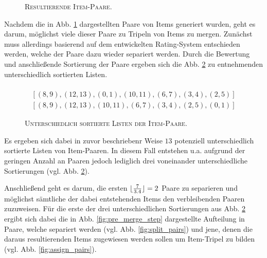 \begin{figure}[H]
\centering
{}
\caption{\textsc{Resultierende Item-Paare}.}
\label{fig:item_pairs_example_b=3}
\end{figure}

Nachdem die in Abb. \ref{fig:item_pairs_example_b=3} dargestellten Paare von Items generiert wurden, geht es darum,
möglichst viele dieser Paare zu Tripeln von Items zu mergen. Zunächst muss allerdings basierend auf dem entwickelten Rating-System
entschieden werden, welche der Paare dazu wieder separiert werden. Durch die Bewertung und anschließende Sortierung der Paare
ergeben sich die Abb. \ref{fig:lists_of_pairs} zu entnehmenden unterschiedlich sortierten Listen.
\begin{figure}[H]
\begin{gather*}
  [(12, 13), (10, 11), (8, 9), (6, 7), (3, 4), (2, 5), (0, 1)] \\
  [(8, 9), (12, 13), (0, 1), (10, 11), (6, 7), (3, 4), (2, 5)] \\
  [(8, 9), (12, 13), (10, 11), (6, 7), (3, 4), (2, 5), (0, 1)]
\end{gather*}
\caption{\textsc{Unterschiedlich sortierte Listen der Item-Paare}.}
\label{fig:lists_of_pairs}
\end{figure}
Es ergeben sich dabei in zuvor beschriebenr Weise $13$ potenziell unterschiedlich sortierte Listen von Item-Paaren.
In diesem Fall entstehen u.a. aufgrund der geringen Anzahl an Paaren jedoch lediglich drei voneinander unterschiedliche
Sortierungen (vgl. Abb. \ref{fig:lists_of_pairs}).

Anschließend geht es darum, die ersten $\lfloor\frac{7}{3.4}\rfloor = 2$ Paare zu separieren und möglichst sämtliche der dabei entstehenden
Items den verbleibenden Paaren zuzuweisen. Für die erste der drei unterschiedlichen Sortierungen aus Abb. \ref{fig:lists_of_pairs}
ergibt sich dabei die in Abb. \ref{fig:pre_merge_step} dargestellte Aufteilung in Paare, welche separiert werden
(vgl. Abb. \ref{fig:split_pairs}) und jene, denen die daraus resultierenden Items zugewiesen werden sollen um Item-Tripel zu bilden
(vgl. Abb. \ref{fig:assign_pairs}).


